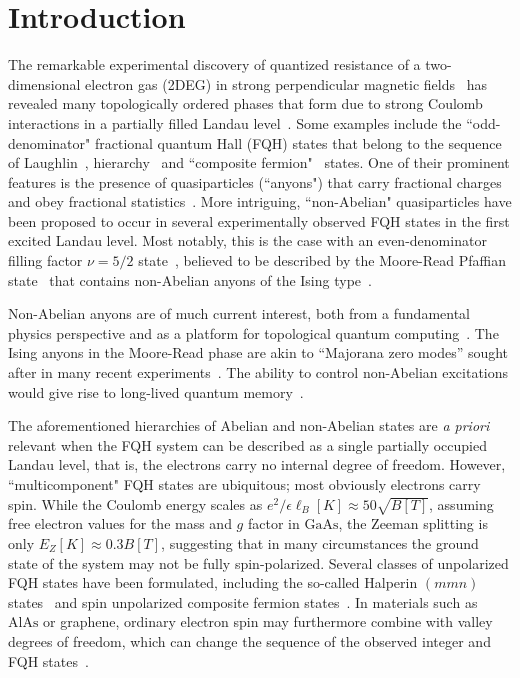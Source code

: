 \section{Introduction}

The remarkable experimental discovery of quantized resistance of a two-dimensional electron gas (2DEG) in strong perpendicular magnetic fields~\cite{Tsui-PhysRevLett.48.1559} has revealed many topologically ordered phases that form due to strong Coulomb interactions in a partially filled Landau level~\cite{prangegirvin}.
 Some examples include the 
 ``odd-denominator" fractional quantum Hall (FQH) states that belong to the sequence of Laughlin~\cite{Laughlin-PhysRevLett.50.1395}, hierarchy~\cite{Haldane1983, Halperin84} and ``composite fermion"~\cite{Jain:1989p294} states. 
 One of their prominent features is the presence of quasiparticles (``anyons") that carry fractional charges~\cite{Laughlin-PhysRevLett.50.1395} and obey fractional statistics~\cite{LeinaasMyrheim, Arovas-Schrieffer-Wilczek}. 
 More intriguing, ``non-Abelian" quasiparticles have been proposed to occur in several experimentally observed FQH states in the first excited Landau level. 
 Most notably, this is the case with an even-denominator filling factor $\nu=5/2$ state~\cite{Willett87}, believed to be described by the Moore-Read Pfaffian state~\cite{MooreRead, Greiter91, Greiter92} that contains non-Abelian anyons of the Ising type~\cite{Nayak96, ReadGreen, BondersonGurarieNayak11}.

Non-Abelian anyons are of much current interest, both from a fundamental physics perspective and as a platform for topological quantum computing~\cite{Kitaev:QC:03,Nayak:TQCReview:2008}.
The Ising anyons in the Moore-Read phase are akin to ``Majorana zero modes'' sought after in many recent experiments~\cite{MourikZuo:InSbWire:2012, Rokhinson:InSbWireFracACJosephson:2012, DengLarssonXu:InSbWire:2012, DasRonen:InAsWire:2012, Nadj-PergeYazdani:2014}.
The ability to control non-Abelian excitations would give rise to long-lived quantum memory~\cite{KitaevWireMajorana:01}.

The aforementioned hierarchies of Abelian and non-Abelian states are \emph{a priori} relevant when the FQH system can be described as a single partially occupied Landau level, that is, the electrons carry no internal degree of freedom.
However, ``multicomponent" FQH states are ubiquitous; most obviously electrons carry spin.
While the Coulomb energy scales as $e^2/\epsilon\ell_B [\unit{K}] \approx 50 \sqrt{B[\unit{T}]}$, assuming free electron values for the mass and $g$ factor in $\mathrm{GaAs}$, the Zeeman splitting is only $E_Z [\unit{K}] \approx 0.3 B[\unit{T}]$, suggesting that in many circumstances the ground state of the system may not be fully spin-polarized. 
Several classes of unpolarized FQH states have been formulated, including the so-called Halperin $(mmn)$ states~\cite{Halperin83} and spin unpolarized composite fermion states~\cite{Wu93, Wu94, Davenport12, Balram14}.
In materials such as $\mathrm{AlAs}$ or graphene, ordinary electron spin may furthermore combine with valley degrees of freedom, which can change the sequence of the observed integer and FQH states~\cite{Bishop07, Padmanabhan09, Gokmen10, Novoselov05, Zhang05, Du09, Bolotin09, Ghahari11, Dean11, Feldman12}. 


